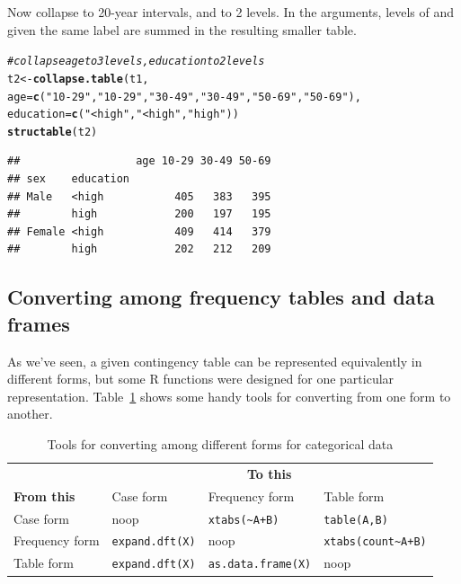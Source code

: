 \documentclass[10pt,twoside]{article}\usepackage[]{graphicx}\usepackage[]{color}
\makeatletter
\newcommand{\hlstr}[1]{\textcolor[rgb]{0.192,0.494,0.8}{#1}}%
\newcommand{\hlcom}[1]{\textcolor[rgb]{0.678,0.584,0.686}{\textit{#1}}}%
\newcommand{\hlstd}[1]{\textcolor[rgb]{0.345,0.345,0.345}{#1}}%
\newcommand{\hlkwb}[1]{\textcolor[rgb]{0.69,0.353,0.396}{#1}}%
\newcommand{\hlkwc}[1]{\textcolor[rgb]{0.333,0.667,0.333}{#1}}%
\newcommand{\hlkwd}[1]{\textcolor[rgb]{0.737,0.353,0.396}{\textbf{#1}}}%
\newenvironment{kframe}{%
 \def\at@end@of@kframe{}%
 \ifinner\ifhmode%
  \def\at@end@of@kframe{\end{minipage}}%
  \begin{minipage}{\columnwidth}%
 \fi\fi%
 \def\FrameCommand##1{\hskip\@totalleftmargin \hskip-\fboxsep
 \colorbox{shadecolor}{##1}\hskip-\fboxsep
     \hskip-\linewidth \hskip-\@totalleftmargin \hskip\columnwidth}%
 \MakeFramed {\advance\hsize-\width
   \@totalleftmargin\z@ \linewidth\hsize
   \@setminipage}}%
 {\par\unskip\endMakeFramed%
 \at@end@of@kframe}
\newenvironment{knitrout}{}{} %
\newcommand{\tabref}[1]{Table~\ref{#1}}
\let\proglang=\textsf
\makeatother
\begin{document}
Now collapse  to 20-year intervals, and 
to 2 levels. In the arguments, levels of  and 
given the same label are summed in the resulting smaller table.
\begin{knitrout}
\color{fgcolor}\begin{kframe}
\begin{alltt}
\hlcom{# collapse age to 3 levels, education to 2 levels}
\hlstd{t2} \hlkwb{<-} \hlkwd{collapse.table}\hlstd{(t1,}
         \hlkwc{age}\hlstd{=}\hlkwd{c}\hlstd{(}\hlstr{"10-29"}\hlstd{,} \hlstr{"10-29"}\hlstd{,}  \hlstr{"30-49"}\hlstd{,} \hlstr{"30-49"}\hlstd{,} \hlstr{"50-69"}\hlstd{,} \hlstr{"50-69"}\hlstd{),}
         \hlkwc{education}\hlstd{=}\hlkwd{c}\hlstd{(}\hlstr{"<high"}\hlstd{,} \hlstr{"<high"}\hlstd{,} \hlstr{"high"}\hlstd{))}
\hlkwd{structable}\hlstd{(t2)}
\end{alltt}
\begin{verbatim}
##                  age 10-29 30-49 50-69
## sex    education                      
## Male   <high           405   383   395
##        high            200   197   195
## Female <high           409   414   379
##        high            202   212   209
\end{verbatim}
\end{kframe}
\end{knitrout}



\subsection[Converting]{Converting among frequency tables and data frames}

As we've seen, a given contingency table can be represented 
equivalently in different forms,
but some \proglang{R} functions were designed for one particular representation.
\tabref{tab:convert} shows some handy tools for converting from one form to another.

\begin{table}[htb]
 \caption{Tools for converting among different forms for categorical data}\label{tab:convert}
 \begin{center}
   \begin{tabular}{llll}
	\hline
                 & \multicolumn{3}{c}{\textbf{To this}} \\
	\textbf{From this}      &     Case form         & Frequency form             &  Table form \\
	\hline
	Case form      &   noop                 & \verb|xtabs(~A+B)|        &  \verb|table(A,B)|  \\ 
	Frequency form &  \verb|expand.dft(X)|  & noop                      & \verb|xtabs(count~A+B)|\\
	Table form     &  \verb|expand.dft(X)|  & \verb|as.data.frame(X)|   &  noop \\
	\hline
   \end{tabular}
 \end{center}
\end{table}
\end{document}
